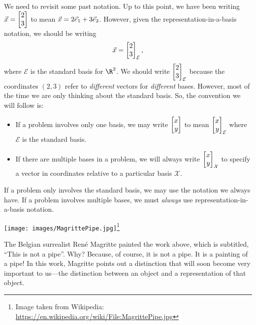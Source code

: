 We need to revisit some past notation. Up to this point, we have been writing $\vec x=\mat{2\\3}$ to mean
$\vec x=2{\vec e_1}+3{\vec e_2}$. However, given the representation-in-a-basis notation, we should be writing
\[
	\vec x=\mat{2\\3}_{\mathcal E},
\]
where $\mathcal E$ is the standard basis for $\R^2$. We should write $\mat{2\\3}_{\mathcal E}$ because the coordinates $(2,3)$
refer to \emph{different} vectors for \emph{different} bases. However, most of the time we are only thinking about the standard
basis. So, the convention we will follow is:
\begin{itemize}
	\item If a problem involves only one basis, we may write $\mat{x\\y}$ to mean $\mat{x\\y}_{\mathcal E}$ where
	$\mathcal E$ is the standard basis.
	\item If there are multiple bases in a problem, we will always write $\mat{x\\y}_{\mathcal X}$ to specify a vector in
	coordinates relative to a particular basis $\mathcal X$.
\end{itemize}

\begin{emphbox}[Takeaway]
	If a problem only involves the standard basis, we may use the notation we always have. If a problem involves
	multiple bases, we must \emph{always} use representation-in-a-basis notation.
\end{emphbox}



\begin{center}
\texttt{[image: images/MagrittePipe.jpg]}\footnote{ Image taken from Wikipedia: \url{https://en.wikipedia.org/wiki/File:MagrittePipe.jpg}} 
\end{center}
The Belgian surrealist Ren\'e Magritte painted the work above, which is subtitled, ``This is not a pipe''. Why? Because, of course, it is not
a pipe. It is a painting of a pipe! In this work, Magritte points out a distinction that will soon become very important to
us---the distinction between an object and a representation of that object.

\bigskip


